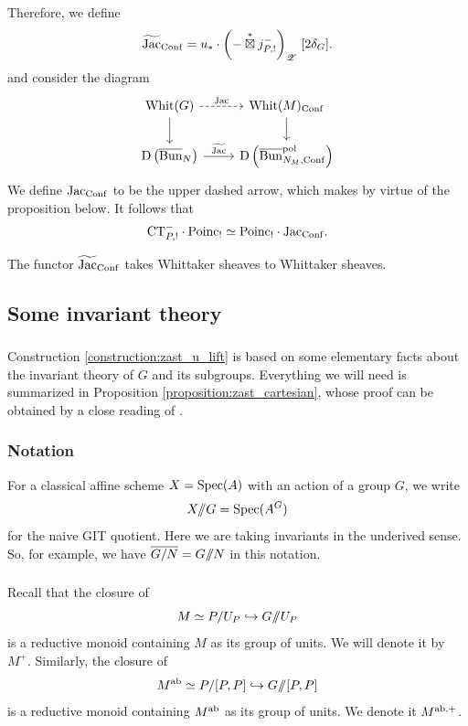 \subsubsection{} Therefore, we define
    \[\widetilde{\mathrm{Jac}}_{\mathrm{Conf}} = u_* \cdot \left( - \overset{*}{\boxtimes} j_{P,!}^- \right)_{\mathscr{Z}} \, [2 \delta_G].\]
and consider the diagram
\[
\begin{tikzcd}
  \Whit(G) \arrow[d] \arrow[r, dashed, "\Jac"] & \Whit(M)_\Conf \arrow[d] \\
  \DMod\left( \Bunc_N \right) \arrow[r, "\Jact"] & \DMod\left( \Bunc_{N_M,\Conf}^\pol \right)
\end{tikzcd}
\]
We define $\mathrm{Jac}_{\mathrm{Conf}}$ to be the upper dashed arrow, which makes by virtue of the proposition below. It follows that
  \[\mathrm{CT}_{P,!}^- \cdot \mathrm{Poinc}_! \simeq \mathrm{Poinc}_! \cdot \mathrm{Jac}_{\mathrm{Conf}}.\]

\begin{proposition}
\label{proposition:Jac_Whit_preservation}
The functor $\widetilde{\mathrm{Jac}}_{\mathrm{Conf}}$ takes Whittaker sheaves to Whittaker sheaves.
\end{proposition}

\subsection{Some invariant theory}

\subsubsection{} Construction \ref{construction:zast_u_lift} is based on some elementary facts about the invariant theory of $G$ and its subgroups. Everything we will need is summarized in Proposition \ref{proposition:zast_cartesian}, whose proof can be obtained by a close reading of \cite[\S3]{wang_monoid}.

\subsubsection{Notation} For a classical affine scheme $X = \mathrm{Spec}(A)$ with an action of a group $G$, we write
    \[X / \!\! / G = \mathrm{Spec}(A^G)\]
for the naive GIT quotient. Here we are taking invariants in the underived sense. So, for example, we have $\overline{G/N} = G / \!\! / N$ in this notation.

\subsubsection{} Recall that the closure of
  \[M \simeq P/U_P \hookrightarrow G / \!\! / U_P\]
is a reductive monoid containing $M$ as its group of units. We will denote it by $M^+$. Similarly, the closure of
  \[M^{\mathrm{ab}} \simeq P/[P,P] \hookrightarrow G / \!\! / [P,P]\]
is a reductive monoid containing $M^{\mathrm{ab}}$ as its group of units. We denote it $M^{\mathrm{ab},+}$. 

